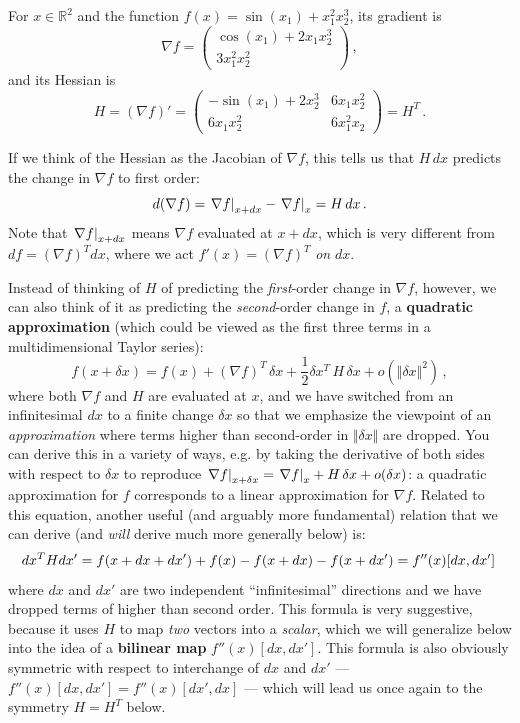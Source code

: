 \begin{example}
For $x \in \mathbb{R}^2$ and the function $f(x) = \sin(x_1) + x_1^2 x_2^3$, its gradient is
$$
\nabla f = \begin{pmatrix} \cos(x_1) + 2x_1 x_2^3 \\
3 x_1^2 x_2^2
\end{pmatrix} \, ,
$$
and its Hessian is
$$
H = (\nabla f)' = \begin{pmatrix} -\sin(x_1) + 2x_2^3 & 6 x_1 x_2^2 \\
6 x_1 x_2^2 & 6 x_1^2 x_2 \end{pmatrix} = H^T \, .
$$
\end{example}

If we think of the Hessian as the Jacobian of $\nabla f$, this tells us that $H \, dx$ predicts the change in $\nabla f$ to first order:
$$
d(\nabla f) = \left. \nabla f \right|_{x+dx} - \left. \nabla f \right|_{x} = H \, dx \, .
$$
Note that $\left. \nabla f \right|_{x+dx}$ means $\nabla f$ evaluated at $x+dx$, which is very different from $df = (\nabla f)^T dx$, where we act $f'(x)=(\nabla f)^T$ \emph{on} $dx$.

Instead of thinking of $H$ of predicting the \emph{first}-order change in $\nabla f$, however, we can also think of it as predicting the \emph{second}-order change in $f$, a \textbf{quadratic approximation} (which could be viewed as the first three terms in a multidimensional Taylor series):
$$
f(x+\delta x) = f(x) + (\nabla f)^T \, \delta x + \frac{1}{2} \delta x^T \, H \, \delta x + o(\Vert \delta x \Vert^2) \, ,
$$
where both $\nabla f$ and $H$ are evaluated at $x$, and we have switched from an infinitesimal $dx$  to a finite change $\delta x$ so that we emphasize the viewpoint of an \emph{approximation} where terms higher than second-order in $\Vert \delta x \Vert$ are dropped.   You can derive this in a variety of ways, e.g. by taking the derivative of both sides with respect to $\delta x$ to reproduce $\left. \nabla f \right|_{x+\delta x} = \left. \nabla f \right|_{x} + H \, \delta x + o(\delta x)$: a quadratic approximation for $f$ corresponds to a linear approximation for $\nabla f$.   Related to this equation, another useful (and arguably more fundamental) relation that we can derive (and \emph{will} derive much more generally below) is:
$$
dx^T H dx' = f(x + d x + d x') + f(x) - f(x + d x) - f(x + d x') = f''(x)[dx,dx'] \, 
$$
where $dx$ and $dx'$ are two independent ``infinitesimal'' directions and we have dropped terms of higher than second order.   This formula is very suggestive, because it uses $H$ to map \emph{two} vectors into a \emph{scalar}, which we will generalize below into the idea of a \textbf{bilinear map} $f''(x)[dx,dx']$.  This formula is also obviously symmetric with respect to interchange of $dx$ and $dx'$ --- $f''(x)[dx,dx'] = f''(x)[dx',dx]$ --- which will lead us once again to the symmetry $H=H^T$ below.


